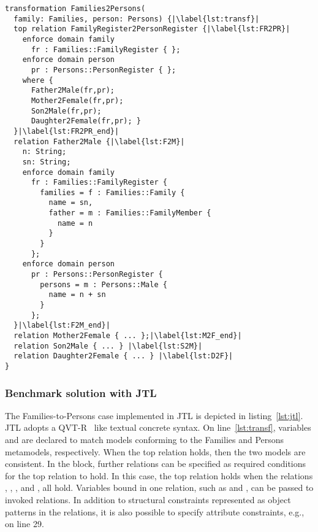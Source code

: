 \begin{lstlisting}[label={lst:jtl}, float=b!, language=jtl, escapechar=|, caption={The Families-to-Persons in JTL}]
transformation Families2Persons(
  family: Families, person: Persons) {|\label{lst:transf}|
  top relation FamilyRegister2PersonRegister {|\label{lst:FR2PR}|
    enforce domain family 
      fr : Families::FamilyRegister { };
    enforce domain person 
      pr : Persons::PersonRegister { };
    where {
      Father2Male(fr,pr);
      Mother2Female(fr,pr);
      Son2Male(fr,pr);
      Daughter2Female(fr,pr); }
  }|\label{lst:FR2PR_end}|	
  relation Father2Male {|\label{lst:F2M}|
    n: String;
    sn: String;
    enforce domain family 
      fr : Families::FamilyRegister {
        families = f : Families::Family {
          name = sn,
          father = m : Families::FamilyMember { 
            name = n 
          }
        }
      };
    enforce domain person 
      pr : Persons::PersonRegister {
        persons = m : Persons::Male {
          name = n + sn
        }
      };
  }|\label{lst:F2M_end}|	
  relation Mother2Female { ... };|\label{lst:M2F_end}| 	
  relation Son2Male { ... } |\label{lst:S2M}| 
  relation Daughter2Female { ... } |\label{lst:D2F}| 
}
\end{lstlisting}

\subsubsection{Benchmark solution with JTL}

The Families-to-Persons case implemented in JTL is depicted in listing~\ref{lst:jtl}.
JTL adopts a QVT-R~\cite{QVT-1.3} like textual concrete syntax.
On line~\ref{lst:transf}, variables  and
 are declared to match models conforming to the Families and Persons metamodels, respectively.
When the top relation  holds, then the two models are consistent.
In the  block, further relations can be specified as required conditions for the top relation to hold.
In this case, the top relation holds when the relations , , , and , all hold.
Variables bound in one relation, such as  and , can be passed to invoked relations.
In addition to structural constraints represented as object patterns in the relations, it is also possible to specify attribute constraints, e.g., on line 29.

